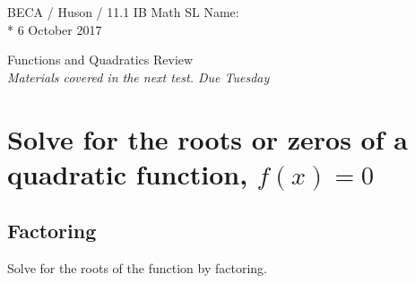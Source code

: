 \documentclass[]{book}
\begin{document}
\noindent BECA / Huson / 11.1 IB Math SL \hspace{2in} Name:\\*
6 October 2017
\begin{center}
{\Large Functions and Quadratics Review}\\
\textit{Materials covered in the next test. Due Tuesday}
\end{center}



\section*{Solve for the roots or zeros of a quadratic function, $f(x)=0$}

\subsection*{Factoring}

Solve for the roots of the function by factoring.
\end{document}
